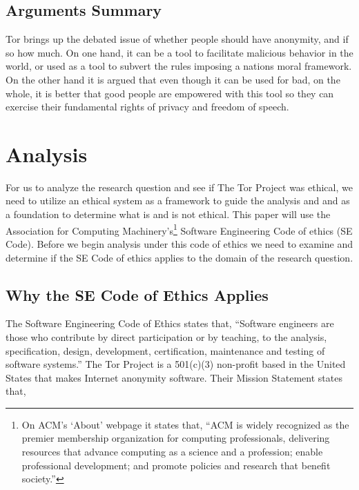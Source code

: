 \documentclass[11pt]{article}
\begin{document}
\begin{multicols}{2}
\subsection{Arguments Summary}

Tor brings up the debated issue of whether people should have anonymity, and if so
how much. On one hand, it can be a tool to facilitate malicious behavior in the
world, or used as a tool to subvert the rules imposing a nations moral framework. On
the other hand it is argued that even though it can be used for bad, on the whole, it
is  better that good people are empowered with this tool so they can exercise
their fundamental rights of privacy and freedom of speech.

\section{Analysis}

For us to analyze the research question and see if The Tor
Project was ethical, we need to utilize an ethical system as a framework
to guide the analysis and and as a foundation to determine what is and is
not ethical. This paper will use the Association for Computing
Machinery's\footnote{On ACM's `About' webpage it states that, ``ACM is widely
  recognized as the premier membership organization for computing professionals,
  delivering resources that advance computing as a science and a profession;
  enable professional development; and promote policies and research that
  benefit society.''\cite{ACM:About}} Software Engineering Code of ethics (SE
  Code).  Before we begin analysis under this code of ethics we need to examine
  and determine if the SE Code of ethics applies to the domain of the research
  question.

\subsection{Why the SE Code of Ethics Applies} 

The Software Engineering Code of Ethics states that, ``Software engineers are
those who contribute by direct participation or by teaching, to the analysis,
specification, design, development, certification, maintenance and testing of
software systems.'' \cite{SE:CodeOfEthics} The Tor Project is a 501(c)(3)
non-profit based in the United States that makes Internet anonymity
software.\cite{Tor:FAQ, Tor:CorePeople} Their Mission Statement states that,


\end{multicols}
\end{document}
